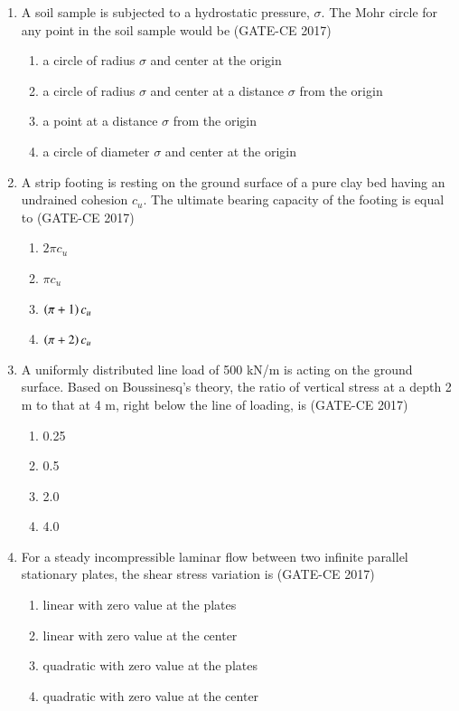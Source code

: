 \documentclass[journal,12pt,onecolumn]{article}
\theoremstyle{remark}
\begin{document}
\begin{enumerate}
    \item A soil sample is subjected to a hydrostatic pressure, $\sigma$. The Mohr circle for any point in the soil sample would be \hfill (GATE-CE 2017)
    \begin{enumerate}
        \item a circle of radius $\sigma$ and center at the origin
        \item a circle of radius $\sigma$ and center at a distance $\sigma$ from the origin
        \item a point at a distance $\sigma$ from the origin
        \item a circle of diameter $\sigma$ and center at the origin
    \end{enumerate}

    \item A strip footing is resting on the ground surface of a pure clay bed having an undrained cohesion $c_{u}$. The ultimate bearing capacity of the footing is equal to \hfill (GATE-CE 2017)
    \begin{multicols}{4}
    \begin{enumerate}
        \item $2\pi c_{u}$
        \item $\pi c_{u}$
        \item $\left(\pi+1\right) c_{u}$
        \item $\left(\pi+2\right) c_{u}$
    \end{enumerate}
    \end{multicols}

    \item A uniformly distributed line load of 500 kN/m is acting on the ground surface. Based on Boussinesq's theory, the ratio of vertical stress at a depth 2 m to that at 4 m, right below the line of loading, is \hfill (GATE-CE 2017)
    \begin{multicols}{4}
    \begin{enumerate}
        \item 0.25
        \item 0.5
        \item 2.0
        \item 4.0
    \end{enumerate}
    \end{multicols}

    \item For a steady incompressible laminar flow between two infinite parallel stationary plates, the shear stress variation is \hfill (GATE-CE 2017)
    \begin{enumerate}
        \item linear with zero value at the plates
        \item linear with zero value at the center
        \item quadratic with zero value at the plates
        \item quadratic with zero value at the center
    \end{enumerate}


\end{enumerate}
\end{document}
